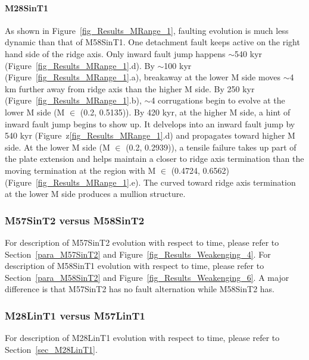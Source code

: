 \documentclass[draft,gc]{agutex}
\begin{document}
\begin{article}
\paragraph{M28SinT1}\label{para_M28SinT1}
As shown in Figure~\ref{fig_Results_MRange_1}, faulting evolution is much less dynamic than that of M58SinT1. One detachment fault keeps active on the right hand side of the ridge axis. Only inward fault jump happens $\sim$540 kyr (Figure~\ref{fig_Results_MRange_1}.d). By $\sim$100 kyr (Figure~\ref{fig_Results_MRange_1}.a), breakaway at the lower M side moves $\sim$4 km further away from ridge axis than the higher M side. By 250 kyr (Figure~\ref{fig_Results_MRange_1}.b), $\sim$4 corrugations begin to evolve at the lower M side (M $\in$ (0.2, 0.5135)). By 420 kyr, at the higher M side, a hint of inward fault jump begins to show up. It delvelops into an inward fault jump by 540 kyr (Figure~z\ref{fig_Results_MRange_1}.d) and propagates toward higher M side. At the lower M side (M $\in$ (0.2, 0.2939)), a tensile failure takes up part of the plate extension and helps maintain a closer to ridge axis termination than the moving termination at the region with M $\in$ (0.4724, 0.6562) (Figure~\ref{fig_Results_MRange_1}.e). The curved toward ridge axis termination at the lower M side produces a mullion structure.

\subsubsection{M57SinT2 versus M58SinT2}
For description of M57SinT2 evolution with respect to time, please refer to Section~\ref{para_M57SinT2} and Figure~\ref{fig_Results_Weakenging_4}. For description of M58SinT1 evolution with respect to time, please refer to Section~\ref{para_M58SinT2} and Figure~\ref{fig_Results_Weakenging_6}. A major difference is that M57SinT2 has no fault alternation while M58SinT2 has.

\subsubsection{M28LinT1 versus M57LinT1}
For description of M28LinT1 evolution with respect to time, please refer to Section~\ref{sec_M28LinT1}.

\end{article}
\end{document}

